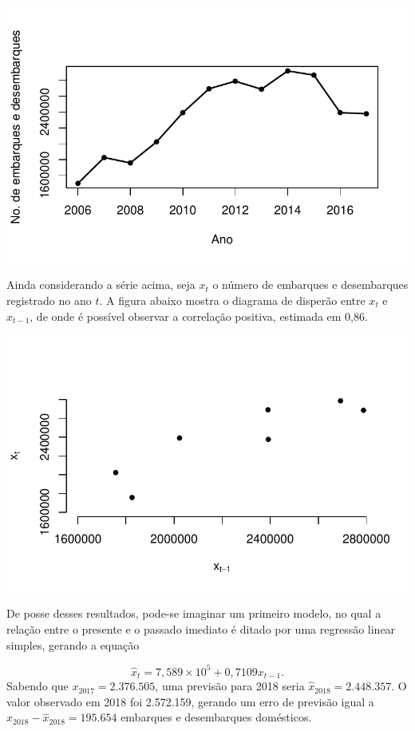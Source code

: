 \documentclass[
  letterpaper,
  DIV=11,
  numbers=noendperiod]{scrreprt}
\theoremstyle{plain}
\theoremstyle{definition}
\theoremstyle{definition}
\theoremstyle{remark}
\begin{document}
\includegraphics{intro_files/figure-pdf/unnamed-chunk-1-1.pdf}

Ainda considerando a série acima, seja \(x_t\) o número de embarques e
desembarques registrado no ano \(t\). A figura abaixo mostra o diagrama
de disperão entre \(x_t\) e \(x_{t-1}\), de onde é possível observar a
correlação positiva, estimada em 0,86.

\includegraphics{intro_files/figure-pdf/unnamed-chunk-2-1.pdf}

De posse desses resultados, pode-se imaginar um primeiro modelo, no qual
a relação entre o presente e o passado imediato é ditado por uma
regressão linear simples, gerando a equação

\[\hat{x}_t = 7,589\times 10^5 +0,7109 x_{t-1}.\] Sabendo que
\(x_{2017}=2.376.505\), uma previsão para 2018 seria
\(\hat{x}_{2018}=2.448.357\). O valor observado em 2018 foi 2.572.159,
gerando um erro de previsão igual a \(x_{2018}-\hat{x}_{2018}=195.654\)
embarques e desembarques domésticos.
\end{document}
